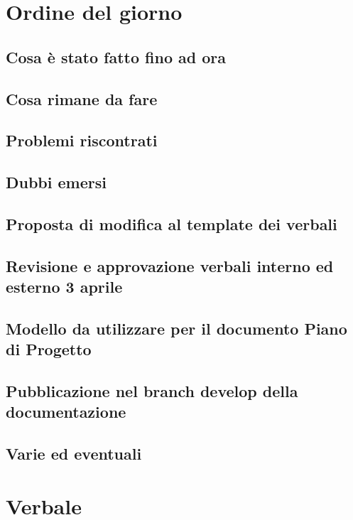 \documentclass[italian,12pt]{article}
\begin{document}
\section{Ordine del giorno}
\subsection{Cosa è stato fatto fino ad ora}
\subsection{Cosa rimane da fare}
\subsection{Problemi riscontrati}
\subsection{Dubbi emersi}
\subsection{Proposta di modifica al template dei verbali}
\subsection{Revisione e approvazione verbali interno ed esterno 3 aprile}
\subsection{Modello da utilizzare per il documento Piano di Progetto}
\subsection{Pubblicazione nel branch develop della documentazione}
\subsection{Varie ed eventuali}

\newpage

\section{Verbale}
\end{document}
